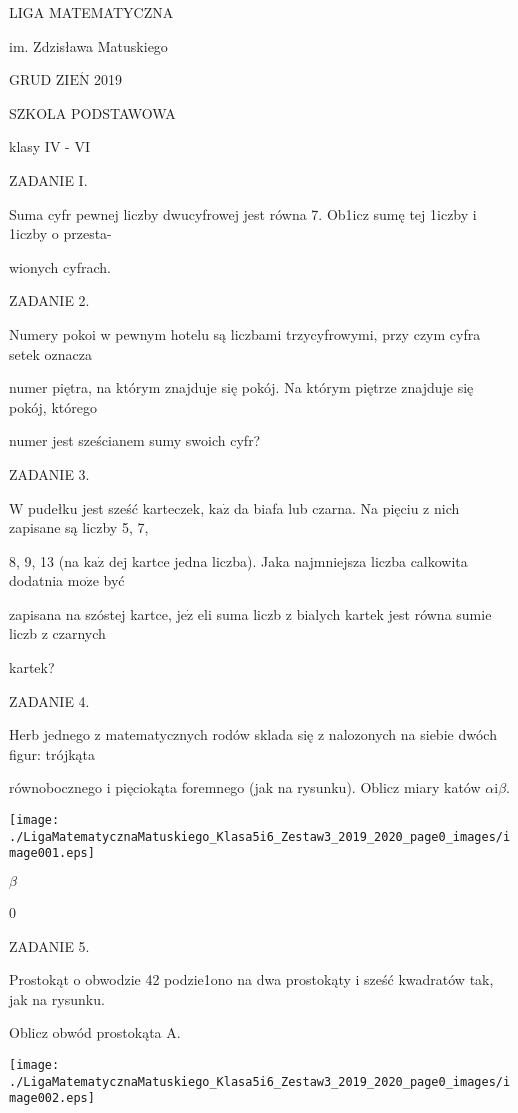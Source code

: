 \documentclass[a4paper,12pt]{article}
\begin{document}
LIGA MATEMATYCZNA

im. Zdzisława Matuskiego

GRUD Z$\mathrm{I}\mathrm{E}\acute{\mathrm{N}}$ 2019

SZKOLA PODSTAWOWA

klasy IV - VI

ZADANIE I.

Suma cyfr pewnej liczby dwucyfrowej jest równa 7. Ob1icz sumę tej 1iczby i 1iczby o przesta-

wionych cyfrach.

ZADANIE 2.

Numery pokoi w pewnym hotelu są liczbami trzycyfrowymi, przy czym cyfra setek oznacza

numer piętra, na którym znajduje się pokój. Na którym piętrze znajduje się pokój, którego

numer jest sześcianem sumy swoich cyfr?

ZADANIE 3.

$\mathrm{W}$ pudełku jest sześć karteczek, $\mathrm{k}\mathrm{a}\dot{\mathrm{z}}$ da biafa lub czarna. Na pięciu z nich zapisane są liczby 5, 7,

8, 9, 13 (na $\mathrm{k}\mathrm{a}\dot{\mathrm{z}}$ dej kartce jedna liczba). Jaka najmniejsza liczba calkowita dodatnia $\mathrm{m}\mathrm{o}\dot{\mathrm{z}}\mathrm{e}$ być

zapisana na szóstej kartce, $\mathrm{j}\mathrm{e}\dot{\mathrm{z}}$ eli suma liczb z bialych kartek jest równa sumie liczb z czarnych

kartek?

ZADANIE 4.

Herb jednego z matematycznych rodów sklada się z nalozonych na siebie dwóch figur: trójkąta

równobocznego i pięciokąta foremnego (jak na rysunku). Oblicz miary katów $\alpha \mathrm{i}\beta.$
\begin{center}
\texttt{[image: ./LigaMatematycznaMatuskiego\_Klasa5i6\_Zestaw3\_2019\_2020\_page0\_images/image001.eps]}
\end{center}
$\beta$

0

ZADANIE 5.

Prostokąt o obwodzie 42 podzie1ono na dwa prostokąty i sześć kwadratów tak, jak na rysunku.

Oblicz obwód prostokąta A.
\begin{center}
\texttt{[image: ./LigaMatematycznaMatuskiego\_Klasa5i6\_Zestaw3\_2019\_2020\_page0\_images/image002.eps]}
\end{center}
\end{document}
